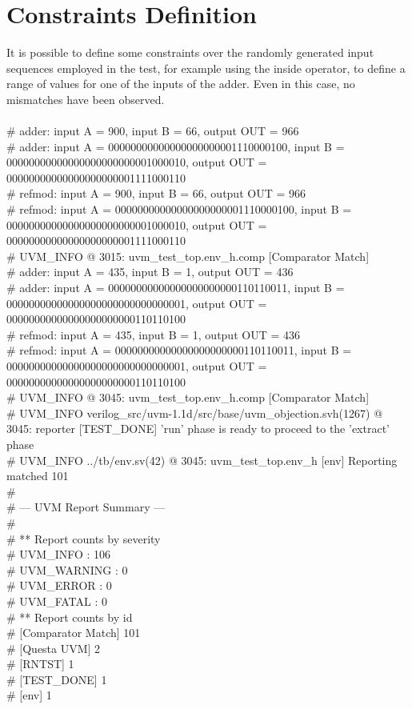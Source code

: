 \section{Constraints Definition}
It is possible to define some constraints over the randomly generated input sequences 
employed in the test, for example using the inside operator, to define a range of values
for one of the inputs of the adder.
Even in this case, no mismatches have been observed.
\\
\\
\# adder: input A =        900, input B =         66, output OUT =        966\\
\# adder: input A = 00000000000000000000001110000100, input B = 00000000000000000000000001000010, output OUT = 00000000000000000000001111000110\\
\# refmod: input A =         900, input B =          66, output OUT =         966\\
\# refmod: input A = 00000000000000000000001110000100, input B = 00000000000000000000000001000010, output OUT = 00000000000000000000001111000110\\
\# UVM\_INFO @ 3015: uvm\_test\_top.env\_h.comp [Comparator Match] \\
\# adder: input A =        435, input B =          1, output OUT =        436\\
\# adder: input A = 00000000000000000000000110110011, input B = 00000000000000000000000000000001, output OUT = 00000000000000000000000110110100\\
\# refmod: input A =         435, input B =           1, output OUT =         436\\
\# refmod: input A = 00000000000000000000000110110011, input B = 00000000000000000000000000000001, output OUT = 00000000000000000000000110110100\\
\# UVM\_INFO @ 3045: uvm\_test\_top.env\_h.comp [Comparator Match] \\
\# UVM\_INFO verilog\_src/uvm-1.1d/src/base/uvm\_objection.svh(1267) @ 3045: reporter [TEST\_DONE] 'run' phase is ready to proceed to the 'extract' phase\\
\# UVM\_INFO ../tb/env.sv(42) @ 3045: uvm\_test\_top.env\_h [env] Reporting matched 101\\
\# \\
\# --- UVM Report Summary ---\\
\# \\
\# ** Report counts by severity\\
\# UVM\_INFO :  106\\
\# UVM\_WARNING :    0\\
\# UVM\_ERROR :    0\\
\# UVM\_FATAL :    0\\
\# ** Report counts by id\\
\# [Comparator Match]   101\\
\# [Questa UVM]     2\\
\# [RNTST]     1\\
\# [TEST\_DONE]     1\\
\# [env]     1\\

